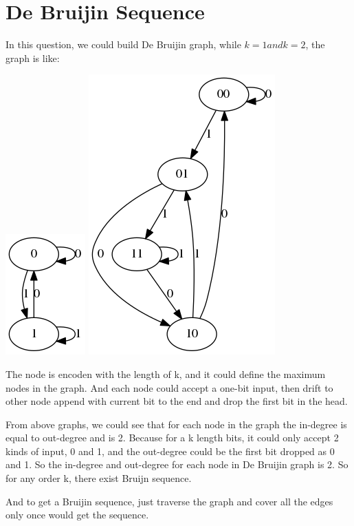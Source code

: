 \documentclass[12pt,a4paper]{article}
\begin{document}
\section{De Bruijin Sequence}
In this question, we could build De Bruijin graph, while $k=1 and k=2$, the graph is like:

\includegraphics{PIC/DBg1.png}
\includegraphics{PIC/DBg2.png}

The node is encoden with the length of k, and it could define the maximum nodes in the graph. And each node could accept a one-bit input, then drift to other node append with current bit to the end and drop the first bit in the head.

From above graphs, we could see that for each node in the graph the in-degree is equal to out-degree and is 2. Because for a k length bits, it could only accept 2 kinds of input, 0 and 1, and the out-degree could be the first bit dropped as 0 and 1. So the in-degree and out-degree for each node in De Bruijin graph is 2. So for any order k, there exist Bruijn sequence.

And to get a Bruijin sequence, just traverse the graph and cover all the edges only once would get the sequence. 
\end{document}
